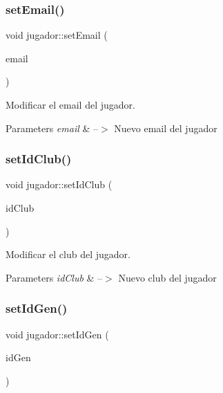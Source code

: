 \subsubsection{\texorpdfstring{set\+Email()}{setEmail()}}
{\footnotesize\ttfamily void jugador\+::set\+Email (\begin{DoxyParamCaption}\item[{Q\+String}]{email }\end{DoxyParamCaption})}



Modificar el email del jugador. 


\begin{DoxyParams}{Parameters}
{\em email} & --$>$ Nuevo email del jugador \\
\hline
\end{DoxyParams}
\mbox{\label{classjugador_ac869d669d44efd142595e087cbb2b3f3}} 
\subsubsection{\texorpdfstring{set\+Id\+Club()}{setIdClub()}}
{\footnotesize\ttfamily void jugador\+::set\+Id\+Club (\begin{DoxyParamCaption}\item[{int}]{id\+Club }\end{DoxyParamCaption})}



Modificar el club del jugador. 


\begin{DoxyParams}{Parameters}
{\em id\+Club} & --$>$ Nuevo club del jugador \\
\hline
\end{DoxyParams}
\mbox{\label{classjugador_aa0fd016230cc38f0ac2e7cd6c90003d3}} 
\subsubsection{\texorpdfstring{set\+Id\+Gen()}{setIdGen()}}
{\footnotesize\ttfamily void jugador\+::set\+Id\+Gen (\begin{DoxyParamCaption}\item[{int}]{id\+Gen }\end{DoxyParamCaption})}



